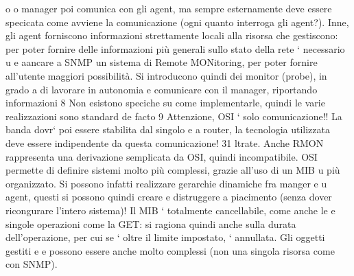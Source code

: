 \documentclass[a4paper,12pt]{article}
\begin{document}
o
o
manager poi comunica con gli agent, ma sempre esternamente deve essere specicata come avviene la comunicazione (ogni
quanto interroga gli agent?). Inne,
gli agent forniscono informazioni strettamente locali alla risorsa che gestiscono:
per poter fornire delle informazioni più generali sullo stato della rete ` necessario
u
e
aancare a SNMP un sistema di Remote MONitoring, per poter fornire all'utente maggiori possibilità. Si introducono quindi
dei monitor (probe), in grado
a
di lavorare in autonomia e comunicare con il manager, riportando informazioni
8 Non esistono speciche su come implementarle, quindi le varie realizzazioni sono standard
de facto
9 Attenzione, OSI ` solo comunicazione!! La banda dovr` poi essere stabilita dal singolo
e
a
router, la tecnologia utilizzata deve essere indipendente da questa comunicazione!
31
ltrate. Anche RMON rappresenta una derivazione semplicata da OSI, quindi
incompatibile.
OSI permette di definire sistemi molto più complessi, grazie all'uso di un MIB
u
più organizzato. Si possono infatti realizzare gerarchie dinamiche fra manger e
u
agent, questi si possono quindi creare e distruggere a piacimento (senza dover
ricongurare l'intero sistema)! Il MIB ` totalmente cancellabile, come anche le
e
singole operazioni come la GET: si ragiona quindi anche sulla durata dell'operazione, per cui se ` oltre il limite
impostato, ` annullata. Gli oggetti gestiti
e
e
possono essere anche molto complessi (non una singola risorsa come con SNMP).
\end{document}

